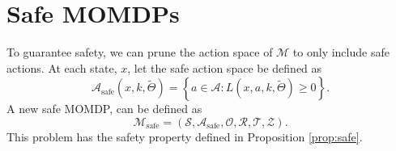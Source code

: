 \documentclass{article}
\newcommand{\sspace}{\ensuremath{\mathcal{S}} }
\newcommand{\aspace}{\ensuremath{\mathcal{A}} }
\newcommand{\ospace}{\ensuremath{\mathcal{O}} }
\newcommand{\tdist}{\ensuremath{\mathcal{T}} }
\newcommand{\odist}{\ensuremath{\mathcal{Z}} }
\newcommand{\reward}{\ensuremath{\mathcal{R}} }
\newcommand{\dsspace}{\Theta}
\begin{document}
% 
% 
% 
% 
% 
% 
% 
% 

\section{Safe MOMDPs}

To guarantee safety, we can prune the action space of $\mathcal{M}$ to only include safe actions. At each state, $x$, let the safe action space be defined as
\begin{equation}
    \aspace_\text{safe}(x, k, \tilde{\dsspace}) = \left\{a \in \aspace : L\left(x,a,k,\tilde{\dsspace}\right) \geq 0 \right\} \text{.}
\end{equation}
A new safe MOMDP, can be defined as
\begin{equation}
    \mathcal{M}_\text{safe} = (\sspace, \aspace_\text{safe}, \ospace, \reward, \tdist, \odist) \text{.}
\end{equation}
This problem has the safety property defined in Proposition \ref{prop:safe}.
\end{document}
